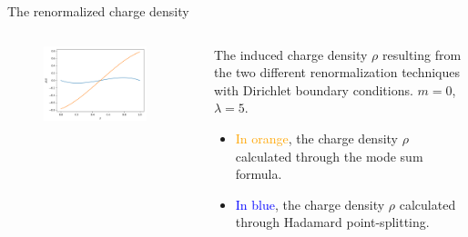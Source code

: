 %
\begin{frame}{The renormalized charge density}
	\begin{columns}
	    \begin{column}{0.5\textwidth}
	    	    \begin{figure}[h]
	    	    	\centering
	    	    	\includegraphics[width=0.9\textwidth]{figures/renormalization_comparison_rho.png}
	    	    \end{figure}
	    \end{column}
	    \begin{column}{0.5\textwidth}
		    The induced charge density $\rho$ resulting from the two different renormalization techniques with Dirichlet boundary conditions. $m=0$, $\lambda=5$.
		    \begin{itemize}
		    	\item \textcolor{orange}{In orange}, the charge density $\rho$ calculated through the mode sum formula.
			\item \textcolor{blue}{In blue}, the charge density $\rho$ calculated through Hadamard point-splitting. 
		    \end{itemize}
		    
	    \end{column}
	\end{columns}
	    \end{frame}


